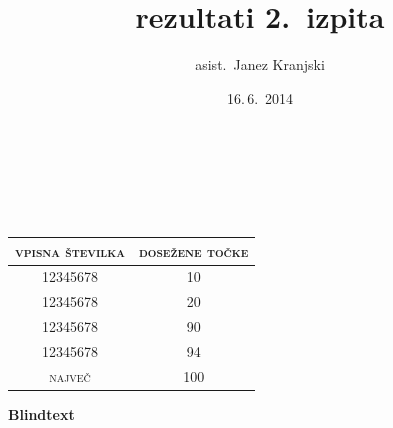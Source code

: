 \documentclass[12pt,a4paper]{letter}
\title{rezultati 2.~izpita}
\author{asist.~Janez Kranjski}
\date{16.\,6.~2014}
\makeatletter
\newcommand{\@subject}{}
\renewcommand{\maketitle}{\begin{center}
\textbf{\huge \@subject}\\[1cm]
\textit{\Large \@title}\\[3mm]
\textit{\large \@date}\\
\end{center}}
\newcommand{\myname}{\@author}
\makeatother
\begin{document}

\maketitle

\vspace{2.5cm}

\begin{center}
\renewcommand{\arraystretch}{1.5}
\begin{tabular}{c|c}
\textsc{vpisna številka} & \textsc{dosežene točke} \\\hline
12345678 & 10 \\
12345678 & 20 \\
12345678 & 90 \\
12345678 & 94 \\\hline
\textsc{največ} & 100
\end{tabular}
\end{center}

\vfill
\myname
\vspace{2cm}

\newpage


\textbf{Blindtext}

\Blindtext
\end{document}
